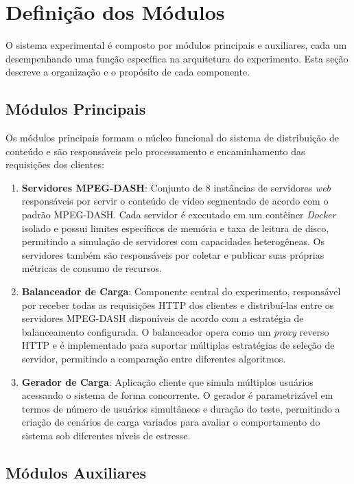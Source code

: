 \section{Definição dos Módulos}

O sistema experimental é composto por módulos principais e auxiliares, cada um desempenhando uma função específica na arquitetura do experimento. Esta seção descreve a organização e o propósito de cada componente.

\subsection{Módulos Principais}

Os módulos principais formam o núcleo funcional do sistema de distribuição de conteúdo e são responsáveis pelo processamento e encaminhamento das requisições dos clientes:

\begin{enumerate}
    \item \textbf{Servidores MPEG-DASH}: Conjunto de 8 instâncias de servidores \textit{web} responsáveis por servir o conteúdo de vídeo segmentado de acordo com o padrão MPEG-DASH. Cada servidor é executado em um contêiner \textit{Docker} isolado e possui limites específicos de memória e taxa de leitura de disco, permitindo a simulação de servidores com capacidades heterogêneas. Os servidores também são responsáveis por coletar e publicar suas próprias métricas de consumo de recursos.
    
    \item \textbf{Balanceador de Carga}: Componente central do experimento, responsável por receber todas as requisições HTTP dos clientes e distribuí-las entre os servidores MPEG-DASH disponíveis de acordo com a estratégia de balanceamento configurada. O balanceador opera como um \textit{proxy} reverso HTTP e é implementado para suportar múltiplas estratégias de seleção de servidor, permitindo a comparação entre diferentes algoritmos.
    
    \item \textbf{Gerador de Carga}: Aplicação cliente que simula múltiplos usuários acessando o sistema de forma concorrente. O gerador é parametrizável em termos de número de usuários simultâneos e duração do teste, permitindo a criação de cenários de carga variados para avaliar o comportamento do sistema sob diferentes níveis de estresse.
\end{enumerate}

\subsection{Módulos Auxiliares}

